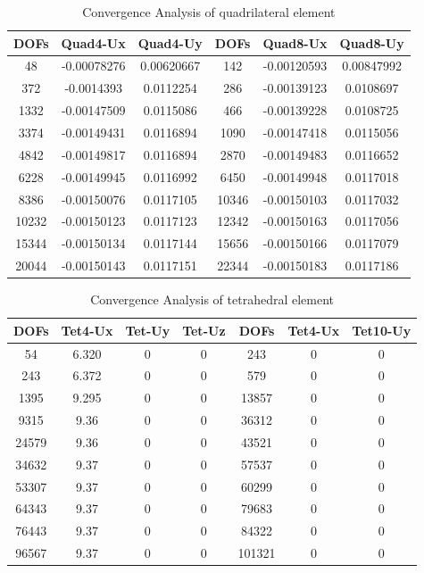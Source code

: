 \begin{table}[ht]
	\caption{Convergence Analysis of quadrilateral element} \label{tab: QuadConvergence}
	\begin{tabular}{ c | c | c | c | c | c} 	
		DOFs & Quad4-Ux & Quad4-Uy & DOFs &Quad8-Ux & Quad8-Uy\\ \hline
		48 & -0.00078276 & 0.00620667 & 142 & -0.00120593 & 0.00847992  \\ 
		372 & -0.0014393 & 0.0112254 & 286 & -0.00139123& 0.0108697 \\
		1332 & -0.00147509 & 0.0115086 & 466 & -0.00139228 & 0.0108725  \\
		3374 & -0.00149431 &  0.0116894&  1090 & -0.00147418& 0.0115056 \\
		4842 & -0.00149817 &  0.0116894&  2870 &-0.00149483 & 0.0116652\\
		6228 & -0.00149945 &  0.0116992& 6450 &  -0.00149948 & 0.0117018  \\
		8386 & -0.00150076 &   0.0117105& 10346 &  -0.00150103 & 0.0117032 \\
		10232 & -0.00150123 &  0.0117123&  12342 & -0.00150163 & 0.0117056\\
		15344 &-0.00150134 & 0.0117144& 15656 & -0.00150166 & 0.0117079 \\
		20044 & -0.00150143 & 0.0117151 & 22344 &  -0.00150183 &  0.0117186\\
		\hline  
	\end{tabular}
\end{table}

\begin{table}[ht]
	\caption{Convergence Analysis of tetrahedral element} \label{tab: TetConvergence}
	\begin{tabular}{ c | c | c | c | c | c | c} 	
		DOFs & Tet4-Ux & Tet-Uy & Tet-Uz & DOFs & Tet4-Ux & Tet10-Uy \\ \hline
		54 & 6.320 & 0 & 0 & 243 & 0  & 0 \\ 
		243 & 6.372 & 0 & 0 & 579 & 0 & 0\\
		1395 & 9.295 & 0 & 0 & 13857 & 0 & 0 \\
		9315 & 9.36 &  0 &  0 & 36312& 0 & 0\\
		24579 & 9.36 &  0 &  0 & 43521 & 0 & 0\\
		34632 & 9.37 &  0 & 0 &  57537 & 0 & 0  \\
		53307 & 9.37 &   0 & 0 &  60299 & 0 & 0 \\
		64343 & 9.37 & 0 &  0 & 79683 & 0 & 0\\
		76443 & 9.37 & 0 & 0 & 84322 & 0 & 0 \\
		96567 & 9.37 & 0 & 0 &  101321 &  0& 0\\
		\hline  
	\end{tabular}
\end{table}


